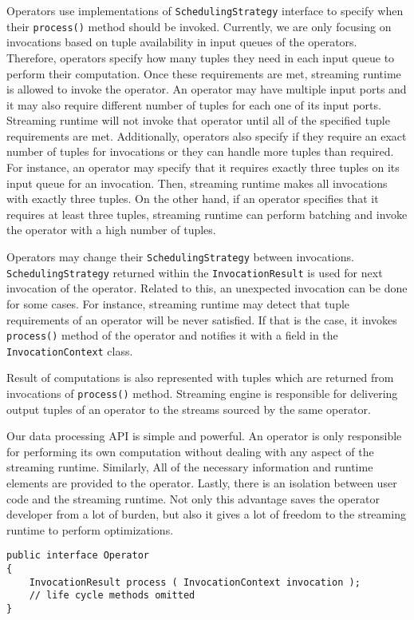 Operators use implementations of \texttt{SchedulingStrategy} interface to specify when their \texttt{process()} method should be invoked. Currently, we are only focusing on invocations based on tuple availability in input queues of the operators. Therefore, operators specify how many tuples they need in each input queue to perform their computation. Once these requirements are met, streaming runtime is allowed to invoke the operator. An operator may have multiple input ports and it may also require different number of tuples for each one of its input ports. Streaming runtime will not invoke that operator until all of the specified tuple requirements are met. Additionally, operators also specify if they require an exact number of tuples for invocations or they can handle more tuples than required. For instance, an operator may specify that it requires exactly three tuples on its input queue for an invocation. Then, streaming runtime makes all invocations with exactly three tuples. On the other hand, if an operator specifies that it requires at least three tuples, streaming runtime can perform batching and invoke the operator with a high number of tuples. 

Operators may change their \texttt{SchedulingStrategy} between invocations. \texttt{SchedulingStrategy} returned within the \texttt{InvocationResult} is used for next invocation of the operator. Related to this, an unexpected invocation can be done for some cases. For instance, streaming runtime may detect that tuple requirements of an operator will be never satisfied. If that is the case, it invokes \texttt{process()} method of the operator and notifies it with a field in the \texttt{InvocationContext} class.

Result of computations is also represented with tuples which are returned from invocations of \texttt{process()} method. Streaming engine is responsible for delivering output tuples of an operator to the streams sourced by the same operator.

Our data processing API is simple and powerful. An operator is only responsible for performing its own computation without dealing with any aspect of the streaming runtime. Similarly, All of the necessary information and runtime elements are provided to the operator. Lastly, there is an isolation between user code and the streaming runtime. Not only this advantage saves the operator developer from a lot of burden, but also it gives a lot of freedom to the streaming runtime to perform optimizations.

\lstset{language=JAVA, caption="Data Processing API"}
\begin{lstlisting}[frame=single] 
public interface Operator
{	 
    InvocationResult process ( InvocationContext invocation );
    // life cycle methods omitted
}
\end{lstlisting}
\label{code:process}

